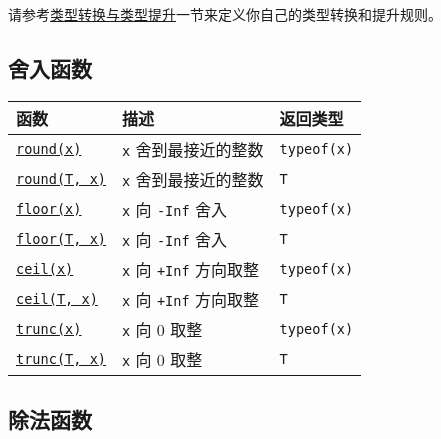请参考\hyperlink{10374023657104680331}{类型转换与类型提升}一节来定义你自己的类型转换和提升规则。



\hypertarget{10733784297691347404}{}


\subsection{舍入函数}




\begin{table}[h]

\begin{tabulary}{\linewidth}{|L|L|L|}
\hline
函数 & 描述 & 返回类型 \\
\hline
\hyperlink{2394121098218027856}{\texttt{round(x)}} & \texttt{x} 舍到最接近的整数 & \texttt{typeof(x)} \\
\hline
\hyperlink{2394121098218027856}{\texttt{round(T, x)}} & \texttt{x} 舍到最接近的整数 & \texttt{T} \\
\hline
\hyperlink{11115257331910840693}{\texttt{floor(x)}} & \texttt{x} 向 \texttt{-Inf} 舍入 & \texttt{typeof(x)} \\
\hline
\hyperlink{11115257331910840693}{\texttt{floor(T, x)}} & \texttt{x} 向 \texttt{-Inf} 舍入 & \texttt{T} \\
\hline
\hyperlink{10519509038312853061}{\texttt{ceil(x)}} & \texttt{x} 向 \texttt{+Inf} 方向取整 & \texttt{typeof(x)} \\
\hline
\hyperlink{10519509038312853061}{\texttt{ceil(T, x)}} & \texttt{x} 向 \texttt{+Inf} 方向取整 & \texttt{T} \\
\hline
\hyperlink{1728363361565303194}{\texttt{trunc(x)}} & \texttt{x} 向 0 取整 & \texttt{typeof(x)} \\
\hline
\hyperlink{1728363361565303194}{\texttt{trunc(T, x)}} & \texttt{x} 向 0 取整 & \texttt{T} \\
\hline
\end{tabulary}

\end{table}



\hypertarget{3613448754755213273}{}


\subsection{除法函数}




